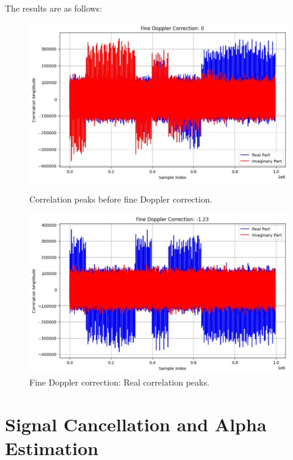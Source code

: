 \documentclass[12pt]{report}
\begin{document}
The results are as follows:
\begin{figure}[H]
    \centering
    \begin{minipage}{0.48\textwidth}
        \centering
        \includegraphics[width=\textwidth]{fine_dopp_a.png}
        \caption{Correlation peaks before fine Doppler correction.}
        \label{fig:fine_dop_a}
    \end{minipage}
    \hfill
    \begin{minipage}{0.48\textwidth}
        \centering
        \includegraphics[width=\textwidth]{fine_dop_b.png}
        \caption{Fine Doppler correction: Real correlation peaks.}
        \label{fig:fine_dop_b}
    \end{minipage}
\end{figure}

\section{Signal Cancellation and Alpha Estimation}
\end{document}
